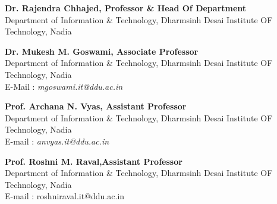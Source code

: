 \begin{cventries}


{\color{subheadings}\fontsize{10.5pt}{1em}\bodyfontlight\selectfont

\begin{flushleft}
\vspace{1mm}
\textbf{Dr. Rajendra Chhajed, Professor & Head Of Department}\\  \vspace{1mm}
	  Department of Information \& Technology, Dharmsinh Desai Institute OF Technology, Nadia  \\
\end{flushleft}

\begin{flushleft}
\vspace{1mm}
\textbf{Dr. Mukesh M. Goswami, Associate Professor}\\  \vspace{1mm}
	  Department of Information \& Technology, Dharmsinh Desai Institute OF Technology, Nadia  \\  \vspace{1mm}  E-Mail : \textit{mgoswami.it@ddu.ac.in}\\
\end{flushleft}

\begin{flushleft}
\vspace{1mm}
\textbf{Prof. Archana N. Vyas, Assistant Professor}\\  \vspace{1mm}
	   Department of Information \& Technology, Dharmsinh Desai Institute OF Technology, Nadia  \\  \vspace{1mm}  E-mail : \textit{anvyas.it@ddu.ac.in }\\
\end{flushleft}

\begin{flushleft}
\vspace{1mm}
\textbf{Prof. Roshni M. Raval,Assistant Professor}\\  \vspace{1mm}
	   Department of Information \& Technology, Dharmsinh Desai Institute OF Technology, Nadia   \\  \vspace{1mm}  E-mail : roshniraval.it@ddu.ac.in\\
\end{flushleft}


\normalfont}
\end{cventries}